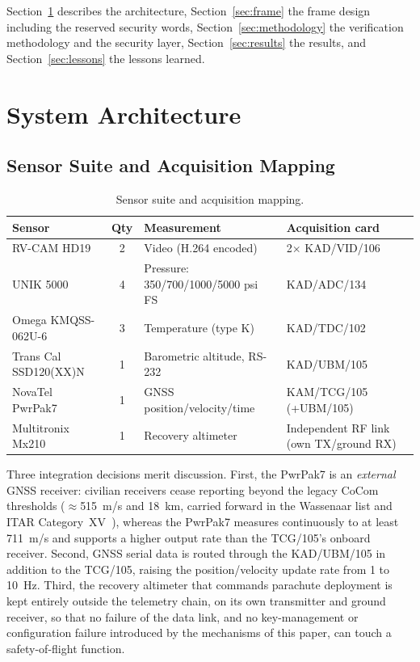\documentclass[12pt,letterpaper]{article}
\begin{document}
Section~\ref{sec:architecture} describes the architecture, Section~\ref{sec:frame} the
frame design including the reserved security words, Section~\ref{sec:methodology} the
verification methodology and the security layer, Section~\ref{sec:results} the results,
and Section~\ref{sec:lessons} the lessons learned.

\section{System Architecture}\label{sec:architecture}

\subsection{Sensor Suite and Acquisition Mapping}\label{sec:sensors}

\begin{table}[htbp]
  \centering
  \caption{Sensor suite and acquisition mapping.}
  \label{tab:sensors}
  \footnotesize
  \begin{tabular}{@{}p{3.4cm}cp{4.8cm}p{4.6cm}@{}}
    \toprule
    Sensor & Qty & Measurement & Acquisition card \\
    \midrule
    RV-CAM HD19 & 2 & Video (H.264 encoded) & 2$\times$ KAD/VID/106 \\
    UNIK 5000 & 4 & Pressure: 350/700/1000/5000 psi FS & KAD/ADC/134 \\
    Omega KMQSS-062U-6 & 3 & Temperature (type K) & KAD/TDC/102 \\
    Trans Cal SSD120(XX)N & 1 & Barometric altitude, RS-232 & KAD/UBM/105 \\
    NovaTel PwrPak7 & 1 & GNSS position/velocity/time & KAM/TCG/105 (+UBM/105) \\
    Multitronix Mx210 & 1 & Recovery altimeter & Independent RF link (own TX/ground RX) \\
    \bottomrule
  \end{tabular}
\end{table}

Three integration decisions merit discussion. First, the PwrPak7 is an \emph{external}
GNSS receiver: civilian receivers cease reporting beyond the legacy CoCom thresholds
(${\approx}$515~m/s and 18~km, carried forward in the Wassenaar list and ITAR
Category~XV~\cite{wassenaar,itar}), whereas the PwrPak7 measures continuously to at least
711~m/s and supports a higher output rate than the TCG/105's onboard receiver. Second, GNSS
serial data is routed through the KAD/UBM/105 in addition to the TCG/105, raising the
position/velocity update rate from 1 to 10~Hz. Third, the recovery altimeter that commands
parachute deployment is kept entirely outside the telemetry chain, on its own transmitter
and ground receiver, so that no failure of the data link, and no key-management or
configuration failure introduced by the mechanisms of this paper, can touch a
safety-of-flight function.
\end{document}
